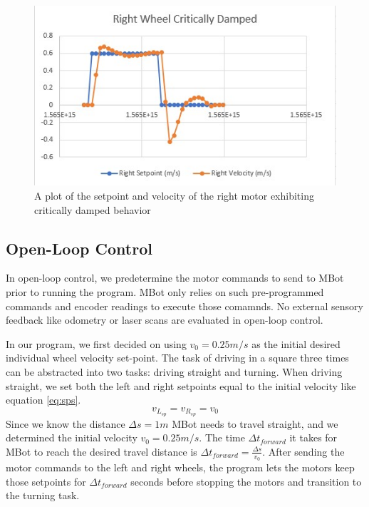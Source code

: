 \documentclass[conference]{IEEEtran}
\begin{document}
\begin{figure}
	\includegraphics[width=\linewidth]{rc.jpg}
	\caption{A plot of the setpoint and velocity of the right motor exhibiting critically damped behavior}
	\label{fig:rc}
\end{figure}

\subsection{Open-Loop Control}
In open-loop control, we predetermine the motor commands to send to MBot prior to running the program. MBot only relies on such pre-programmed commands and encoder readings to execute those comamnds. No external sensory feedback like odometry or laser scans are evaluated in open-loop control.

In our program, we first decided on using $v_0 = 0.25 m/s$ as the initial desired individual wheel velocity set-point. The task of driving in a square three times can be abstracted into two tasks: driving straight and turning. When driving straight, we set both the left and right setpoints equal to the initial velocity like equation \ref{eq:sps}.
\begin{equation} \label{eq:sps}
v_{L_{sp}} = v_{R_{sp}} = v_0
\end{equation}
Since we know the distance $\Delta s = 1 m$ MBot needs to travel straight, and we determined the initial velocity $v_0 = 0.25 m/s$. The time $\Delta t_{forward}$ it takes for MBot to reach the desired travel distance is $\Delta t_{forward} = \frac{\Delta s}{v_0}$. After sending the motor commands to the left and right wheels, the program lets the motors keep those setpoints for $\Delta t_{forward}$ seconds before stopping the motors and transition to the turning task.
\end{document}
